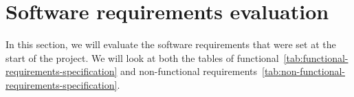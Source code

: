 \section{Software requirements evaluation}\label{sec:software-requirements-evaluation}

In this section, we will evaluate the software requirements that were set at the start of the project.
We will look at both the tables of functional~\ref{tab:functional-requirements-specification}
and non-functional requirements~\ref{tab:non-functional-requirements-specification}.



